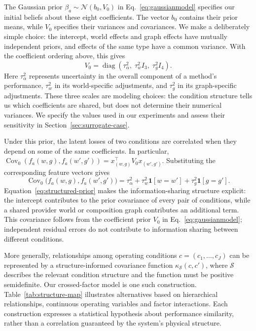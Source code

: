 \documentclass[10pt,a4paper]{article}
\begin{document}
The Gaussian prior $\beta_a\sim\mathcal{N}(b_0,V_0)$ in Eq.~\eqref{eq:gaussianmodel} specifies our initial beliefs about these eight coefficients. The vector $b_0$ contains their prior means, while $V_0$ specifies their variances and covariances. We make a deliberately simple choice: the intercept, world effects and graph effects have mutually independent priors, and effects of the same type have a common variance. With the coefficient ordering above, this gives
\[
V_0=\operatorname{diag}\!\left(
\tau_\alpha^2,\;\tau_w^2 I_3,\;\tau_g^2 I_4
\right).
\]
Here $\tau_\alpha^2$ represents uncertainty in the overall component of a method's performance, $\tau_w^2$ in its world-specific adjustments, and $\tau_g^2$ in its graph-specific adjustments. These three scales are modeling choices: the condition structure tells us which coefficients are shared, but does not determine their numerical variances. We specify the values used in our experiments and assess their sensitivity in Section~\ref{sec:surrogate-case}.

Under this prior, the latent losses of two conditions are correlated when they depend on some of the same coefficients. In particular, $\operatorname{Cov}_0(f_a(w,g),f_a(w',g'))=x_{(w,g)}^\top V_0 x_{(w',g')}$. Substituting the corresponding feature vectors gives
\begin{equation}
\operatorname{Cov}_0\bigl(f_a(w,g),f_a(w',g')\bigr)
=\tau_\alpha^2+\tau_w^2\mathbf{1}[w=w']
 +\tau_g^2\mathbf{1}[g=g'].
\label{eq:structured-prior}
\end{equation}
Equation~\eqref{eq:structured-prior} makes the information-sharing structure explicit: the intercept contributes to the prior covariance of every pair of conditions, while a shared provider world or composition graph contributes an additional term. This covariance follows from the coefficient prior $V_0$ in Eq.~\eqref{eq:gaussianmodel}; independent residual errors do not contribute to information sharing between different conditions.

More generally, relationships among operating conditions $c=(c_1,\ldots,c_J)$ can be represented by a structure-informed covariance function $\kappa_{\mathcal S}(c,c')$, where $\mathcal S$ describes the relevant condition structure and the function must be positive semidefinite. Our crossed-factor model is one such construction. Table~\ref{tab:structure-map} illustrates alternatives based on hierarchical relationships, continuous operating variables and factor interactions. Each construction expresses a statistical hypothesis about performance similarity, rather than a correlation guaranteed by the system's physical structure.
\end{document}
